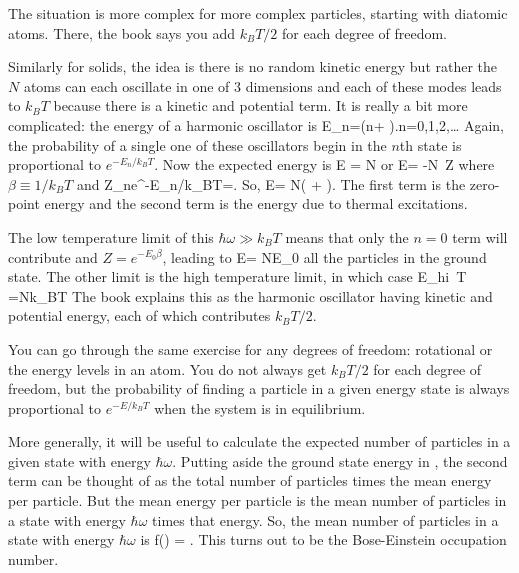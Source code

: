 \documentclass[11pt]{book}
\begin{document}
The situation is more complex for more complex particles, starting with diatomic atoms. There, the book says you add $k_BT/2$ for each degree of freedom. 

Similarly for solids, the idea is there is no random kinetic energy but rather the $N$ atoms can each oscillate in one of 3 dimensions and each of these modes leads to $k_BT$ because there is a kinetic and potential term. It is really a bit more complicated: the energy of a harmonic oscillator is
\be
E_n=\hbar \omega\left(n+ \right).\qquad n=0,1,2,\ldots\ee
Again, the probability of a single one of these oscillators begin in the $n$th state is proportional to $e^{-E_n/k_BT}$. Now the expected energy is
\be
\langle E\rangle
= N
\ee
or
\be
\langle E\rangle = -N\frac{\partial}{\partial\beta} \,\ln Z
\ee
where $\beta\equiv 1/k_BT$ and
\be
Z\equiv \sum_ne^{-E_n/k_BT}=.\ee
So,
\be
\langle E\rangle = N\left(  +  \right).\ee
The first term is the zero-point energy and the second term is the energy due to thermal excitations.

The low temperature limit of this $\hbar\omega \gg k_BT$ means that only the $n=0$ term will contribute and $Z=e^{-E_0\beta}$, leading to
\be
\langle E\rangle = NE_0\ee
all the particles in the ground state. The other limit is the high temperature limit, in which case \be
\langle E\rangle_{hi\, T} =Nk_BT\ee
The book explains this as the harmonic oscillator having kinetic and potential energy, each of which contributes $k_BT/2$.

You can go through the same exercise for any degrees of freedom: rotational or the energy levels in an atom. You do not always get $k_BT/2$ for each degree of freedom, but the probability of finding a particle in a given energy state is always proportional to $e^{-E/k_BT}$ when the system is in equilibrium.

More generally, it will be useful to calculate the expected number of particles in a given state with energy $\hbar\omega$. Putting aside the ground state energy in , the second term can be thought of as the total number of particles times the mean energy per particle. But the mean energy per particle is the mean number of particles in a state with energy $\hbar\omega$ times that energy. So, the mean number of particles in a state with energy $\hbar\omega$ is
\be
f(\omega) = .\ee
This turns out to be the Bose-Einstein occupation number.
\end{document}
